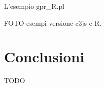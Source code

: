 \documentclass[10pt,titlepage,twoside,a4paper]{report}
\newenvironment{code}{\singlespacing\captionsetup{type=listing}}{}
\begin{document}
\begin{code}
    \caption{L'esempio gpr\_R.pl}
\end{code}

FOTO esempi versione c3js e R.




\chapter{Conclusioni}

TODO




%

\end{document}
